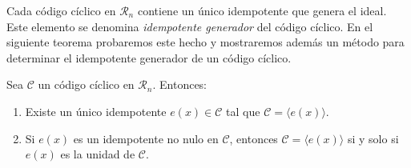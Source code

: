 
Cada código cíclico en \(\mathcal R_n\) contiene un único idempotente que genera el ideal.
Este elemento se denomina \textit{idempotente generador} del código cíclico.
En el siguiente teorema probaremos este hecho y mostraremos además un método para determinar el idempotente generador de un código cíclico.

\begin{theorem}
  \label{th:idempotente-unico-unidad}
  Sea \(\mathcal C\) un código cíclico en \(\mathcal R_n\). Entonces:
  \begin{enumerate}
    \item Existe un único idempotente \(e(x) \in \mathcal C\) tal que \(\mathcal C = \langle e(x)\rangle\).
    \item Si \(e(x)\) es un idempotente no nulo en \(\mathcal C\), entonces \(\mathcal C = \langle e(x)\rangle\) si y solo si \(e(x)\) es la unidad de \(\mathcal C\).
  \end{enumerate}
\end{theorem}

